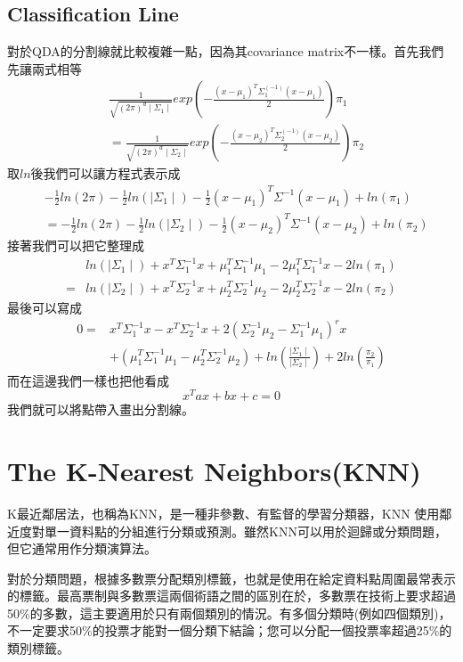 \subsection{Classification Line}
對於QDA的分割線就比較複雜一點，因為其covariance matrix不一樣。首先我們先讓兩式相等
\begin{align*}
&\frac{1}{\sqrt{(2\pi)^d\mid\Sigma_1\mid}}exp\left(-\frac{(x-\mu_1)^T\Sigma_1^{(-1)}(x-\mu_1)}{2}\right)\pi_1\\
&=\frac{1}{\sqrt{(2\pi)^d\mid\Sigma_2\mid}}exp\left(-\frac{(x-\mu_2)^T\Sigma_2^{(-1)}(x-\mu_2)}{2}\right)\pi_2
\end{align*}
取$ln$後我們可以讓方程式表示成
\begin{align*}
&-\frac{1}{2}ln(2\pi)-\frac{1}{2}ln(\mid\Sigma_1\mid)-\frac{1}{2}(x-\mu_1)^T\Sigma^{-1}(x-\mu_1)+ln(\pi_1)\\
&=-\frac{1}{2}ln(2\pi)-\frac{1}{2}ln(\mid\Sigma_2\mid)-\frac{1}{2}(x-\mu_2)^T\Sigma^{-1}(x-\mu_2)+ln(\pi_2)
\end{align*}
接著我們可以把它整理成
\begin{align*}
&ln(\mid\Sigma_1\mid)+x^T\Sigma_1^{-1}x+\mu_1^T\Sigma_1^{-1}\mu_1-2\mu_1^T\Sigma_1^{-1}x-2ln(\pi _1)\\
=&ln(\mid\Sigma_2\mid)+x^T\Sigma_2^{-1}x+\mu_2^T\Sigma_2^{-1}\mu_2-2\mu_2^T\Sigma_2^{-1}x-2ln(\pi _2)
\end{align*}
最後可以寫成
\begin{align*}
0=&x^T\Sigma_1^{-1}x-x^T\Sigma_2^{-1}x+2(\Sigma_2^{-1}\mu_2-\Sigma_1^{-1}\mu_1)^rx\\
&+(\mu_1^T\Sigma_1^{-1}\mu_1-\mu_2^T\Sigma_2^{-1}\mu_2)+ln\left(\frac{\mid\Sigma_1\mid}{\mid\Sigma_2\mid}\right)+2ln\left(\frac{\pi_2}{\pi_1}\right)
\end{align*}
而在這邊我們一樣也把他看成
$$x^Tax+bx+c=0$$
我們就可以將點帶入畫出分割線。


\section{The K-Nearest Neighbors(KNN)}
K最近鄰居法，也稱為KNN，是一種非參數、有監督的學習分類器，KNN 使用鄰近度對單一資料點的分組進行分類或預測。雖然KNN可以用於迴歸或分類問題，但它通常用作分類演算法。

對於分類問題，根據多數票分配類別標籤，也就是使用在給定資料點周圍最常表示的標籤。最高票制與多數票這兩個術語之間的區別在於，多數票在技術上要求超過50\%的多數，這主要適用於只有兩個類別的情況。有多個分類時(例如四個類別)，不一定要求50\%的投票才能對一個分類下結論；您可以分配一個投票率超過25\%的類別標籤。 

